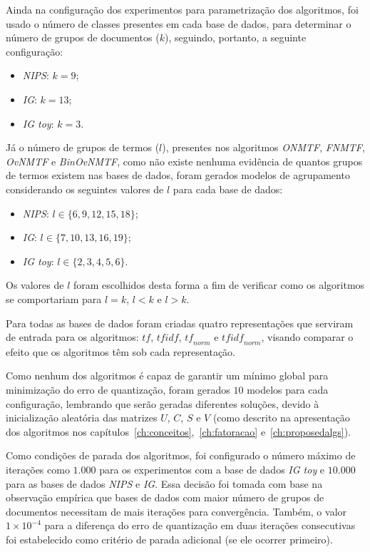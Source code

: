 \documentclass[
    12pt,                %
    oneside,            %
    a4paper,            %
    english,            %
    brazil                %
    ]{abntex2ppgsi}
\begin{document}
Ainda na configuração dos experimentos para parametrização dos algoritmos, foi usado o número de classes presentes em cada base de dados, para determinar o número de grupos de documentos ($k$), seguindo, portanto, a seguinte configuração:

\begin{itemize}
    \item \textit{NIPS}: $k = 9$;
    \item \textit{IG}: $k = 13$;
    \item \textit{IG toy}: $k = 3$.
\end{itemize}


Já o número de grupos de termos ($l$), presentes nos algoritmos \textit{ONMTF}, \textit{FNMTF}, \textit{OvNMTF} e \textit{BinOvNMTF}, como não existe nenhuma evidência de quantos grupos de termos existem nas bases de dados, foram gerados modelos de agrupamento considerando os seguintes valores de $l$ para cada base de dados:
\begin{itemize}
    \item \textit{NIPS}: $l \in \{6, 9, 12, 15, 18\}$;
    \item \textit{IG}: $l \in \{7, 10, 13, 16, 19\}$;
    \item \textit{IG toy}: $l \in \{2, 3, 4, 5, 6\}$.
\end{itemize}

Os valores de $l$ foram escolhidos desta forma a fim de verificar como os algoritmos se comportariam para $l = k$, $l < k$ e $l > k$.

Para todas as bases de dados foram criadas quatro representações que serviram de entrada para os algoritmos: $\textit{tf}$, $\textit{tfidf}$, $\textit{tf}_{norm}$ e $\textit{tfidf}_{norm}$, visando comparar o efeito que os algoritmos têm sob cada representação.

Como nenhum dos algoritmos é capaz de garantir um mínimo global para minimização do erro de quantização, foram gerados $10$ modelos para cada configuração, lembrando que serão geradas diferentes soluções, devido à inicialização aleatória das matrizes $U$, $C$, $S$ e $V$ (como descrito na apresentação dos algoritmos nos capítulos~\ref{ch:conceitos},~\ref{ch:fatoracao} e~\ref{ch:proposedalgs}).

Como condições de parada dos algoritmos, foi configurado o número máximo de iterações como $1.000$ para os experimentos com a base de dados \textit{IG toy} e $10.000$ para as bases de dados \textit{NIPS} e \textit{IG}. Essa decisão foi tomada com base na observação empírica que bases de dados com maior número de grupos de documentos necessitam de mais iterações para convergência.
Também, o valor $1 \times 10^{-4}$ para a diferença do erro de quantização em duas iterações consecutivas foi estabelecido como critério de parada adicional (se ele ocorrer primeiro).
\end{document}
